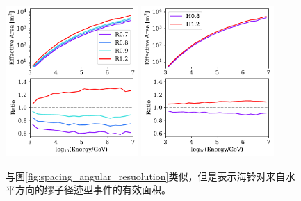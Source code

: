 \begin{figure}[!htb]%
    \centering
    \includegraphics[width=0.45\textwidth]{img/spacing/effective_area_horizontal_hori.pdf}
    \includegraphics[width=0.45\textwidth]{img/spacing/effective_area_horizontal_vert.pdf}
    \caption{与图\ref{fig:spacing_angular_resuolution}类似，但是表示海铃对来自水平方向的缪子径迹型事件的有效面积。}
    \label{fig:spacing_effective_area_horizontal}
\end{figure}


